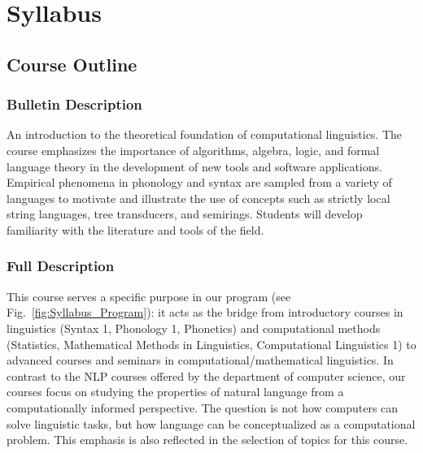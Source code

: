 \setcounter{chapter}{-1}
\chapter{Syllabus}
\label{cha:syllabus}
\setcounter{page}{1}
\pagestyle{fancy}


\section{Course Outline}

\subsection{Bulletin Description}
An introduction to the theoretical foundation of computational linguistics.
The course emphasizes the importance of algorithms, algebra, logic, and formal language theory in the development of new tools and software applications.
Empirical phenomena in phonology and syntax are sampled from a variety of languages to motivate and illustrate the use of concepts such as strictly local string languages, tree transducers, and semirings.
Students will develop familiarity with the literature and tools of the field.

\subsection{Full Description}

This course serves a specific purpose in our program (see Fig.~\vref{fig:Syllabus_Program}):
it acts as the bridge from introductory courses in linguistics (Syntax 1, Phonology 1, Phonetics) and computational methods (Statistics, Mathematical Methods in Linguistics, Computational Linguistics 1) to advanced courses and seminars in computational\slash mathematical linguistics.
In contrast to the NLP courses offered by the department of computer science, our courses focus on studying the properties of natural language from a computationally informed perspective.
The question is not how computers can solve linguistic tasks, but how language can be conceptualized as a computational problem.
This emphasis is also reflected in the selection of topics for this course.

